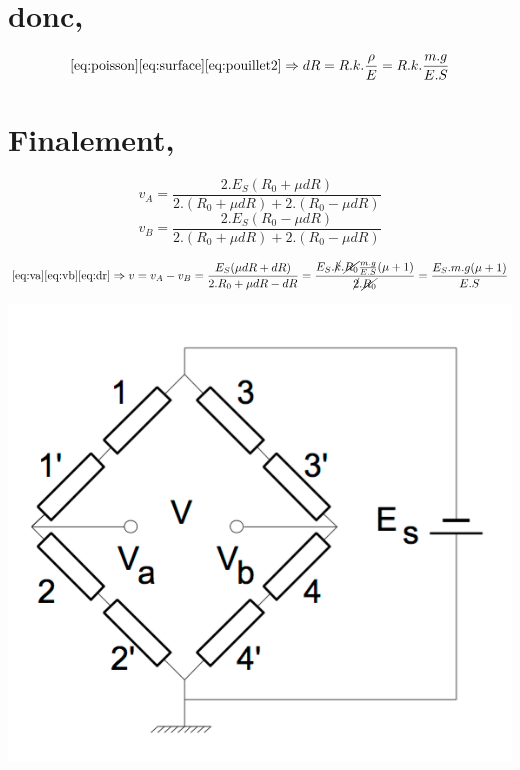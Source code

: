 \documentclass[11pt,a4paper]{report}
\begin{document}
\section*{donc,}
\begin{equation}
\label{eq:dr}
\eqref{eq:poisson} \eqref{eq:surface} \eqref{eq:pouillet2} \Rightarrow dR = R.k.\frac{\rho}{E} = R.k.\frac{m.g}{E.S}
\end{equation}
\section*{Finalement,}
\begin{equation}
\label{eq:va}
v_{A} = \dfrac{2.E_{S}(R_{0}+\mu dR)}{2.(R_{0}+\mu dR)+2.(R_{0}-\mu dR)}
\end{equation}
\begin{equation}
\label{eq:vb}
v_{B} = \dfrac{2.E_{S}(R_{0}-\mu dR)}{2.(R_{0}+\mu dR)+2.(R_{0}-\mu dR)}
\end{equation}

\begin{equation}
\eqref{eq:va} \eqref{eq:vb} \eqref{eq:dr} \Rightarrow v = v_{A} - v_{B} = \dfrac{E_{S}(\mu dR+dR)}{2.R_{0}+\mu dR -dR} = \dfrac{E_{S}.\cancel{k}.\cancel{R_{0}}\frac{m.g}{E.S}(\mu+1)}{\cancel{2}.\cancel{R_{0}}} = \frac{E_{S}.m.g (\mu + 1)}{E.S}
\end{equation}
\begin{center}
\includegraphics[scale=0.5]{wheatstone.png}
\end{center}
\end{document}
